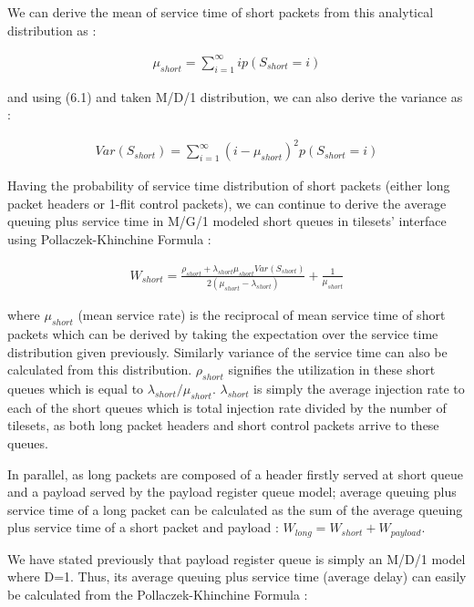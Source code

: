 We can derive the mean of service time of short packets from this analytical distribution as : 

\begin{align}
\mu_{short} = \sum\limits_{i=1}^{\infty} ip(S_{short} = i)  
\end{align}

and using (6.1) and taken M/D/1 distribution, we can also derive the variance as :

\begin{align}
Var(S_{short}) = \sum\limits_{i=1}^{\infty} (i - \mu_{short})^{2}p(S_{short} = i)  
\end{align}

Having the probability of service time distribution of short packets (either long packet headers or 1-flit control packets), we can continue to derive the average queuing plus service time in M/G/1 modeled short queues in tilesets' interface using Pollaczek-Khinchine Formula \cite{khinchin1967mathematical} :

\begin{align}
W_{short} = \frac{\rho_{short}+\lambda_{short}\mu_{short}Var(S_{short})}{2(\mu_{short}-\lambda_{short})}+\frac{1}{\mu_{short}}
\end{align}

where $\mu_{short}$ (mean service rate) is the reciprocal of mean service time of short packets which can be derived by taking the expectation over the service time distribution given previously. Similarly variance of the service time can also be calculated from this distribution. $\rho_{short}$ signifies the utilization in these short queues which is equal to $\lambda_{short}/\mu_{short}$. $\lambda_{short}$ is simply the average injection rate to each of the short queues which is total injection rate divided by the number of tilesets, as both long packet headers and short control packets arrive to these queues.


In parallel, as long packets are composed of a header firstly served at short queue and a payload served by the payload register queue model; average queuing plus service time of a long packet can be calculated as the sum of the average queuing plus service time of a short packet and payload : $W_{long} = W_{short} + W_{payload}$. 

We have stated previously that payload register queue is simply an M/D/1 model where D=1. Thus, its average queuing plus service time (average delay) can easily be calculated from the  Pollaczek-Khinchine Formula : 

